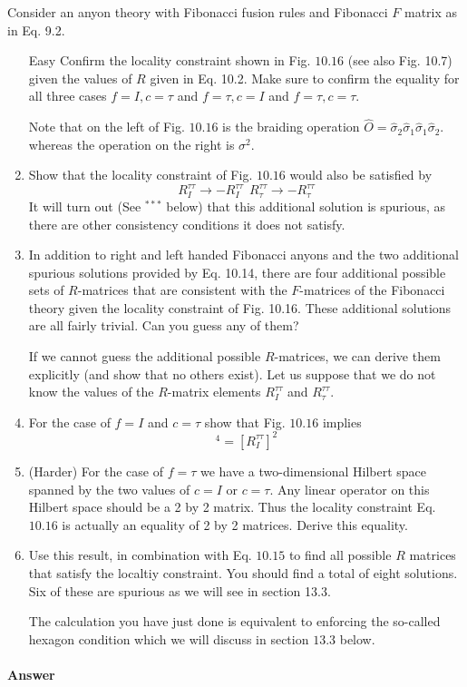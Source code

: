 \documentclass{book}
\begin{document}
Consider an anyon theory with Fibonacci fusion rules and Fibonacci $F$ matrix as in Eq. 9.2.
\begin{enumerate}
\item [Easy] Confirm the locality constraint shown in Fig. $10.16$ (see also Fig. 10.7) given the values of $R$ given in Eq. 10.2. Make sure to confirm the equality for all three cases $f=I,c=\tau $ and $f=\tau ,c=I$ and $f=\tau ,c=\tau $. 

Note that on the left of Fig. $10.16$ is the braiding operation $\hat{O} =\hat{\sigma }_{2}\hat{\sigma }_{1}\hat{\sigma }_{1}\hat{\sigma }_{2}$. whereas the operation on the right is $\sigma ^{2}$.
\item Show that the locality constraint of Fig. $10.16$ would also be satisfied by\begin{equation*}
R_{I}^{\tau \tau }\rightarrow -R_{I}^{\tau \tau } \ \ R_{\tau }^{\tau \tau }\rightarrow -R_{\tau }^{\tau \tau }
\end{equation*}It will turn out (See $^{***}$ below) that this additional solution is spurious, as there are other consistency conditions it does not satisfy.
\item In addition to right and left handed Fibonacci anyons and the two additional spurious solutions provided by Eq. 10.14, there are four additional possible sets of $R$-matrices that are consistent with the $F$-matrices of the Fibonacci theory given the locality constraint of Fig. 10.16. These additional solutions are all fairly trivial. Can you guess any of them?

If we cannot guess the additional possible $R$-matrices, we can derive them explicitly (and show that no others exist). Let us suppose that we do not know the values of the $R$-matrix elements $R_{I}^{\tau \tau }$ and $R_{\tau }^{\tau \tau }$.
\item For the case of $f=I$ and $c=\tau $ show that Fig. $10.16$ implies\begin{equation*}
[R_{\tau }^{\tau \tau } ]^{4} =[R_{I}^{\tau \tau } ]^{2}
\end{equation*}
\item (Harder) For the case of $f=\tau $ we have a two-dimensional Hilbert space spanned by the two values of $c=I$ or $c=\tau $. Any linear operator on this Hilbert space should be a 2 by 2 matrix. Thus the locality constraint Eq. $10.16$ is actually an equality of 2 by 2 matrices. Derive this equality.
\item Use this result, in combination with Eq. $10.15$ to find all possible $R$ matrices that satisfy the localtiy constraint. You should find a total of eight solutions. Six of these are spurious as we will see in section 13.3.

The calculation you have just done is equivalent to enforcing the so-called hexagon condition which we will discuss in section $13.3$ below.
\end{enumerate}

\paragraph{Answer}




\end{document}
